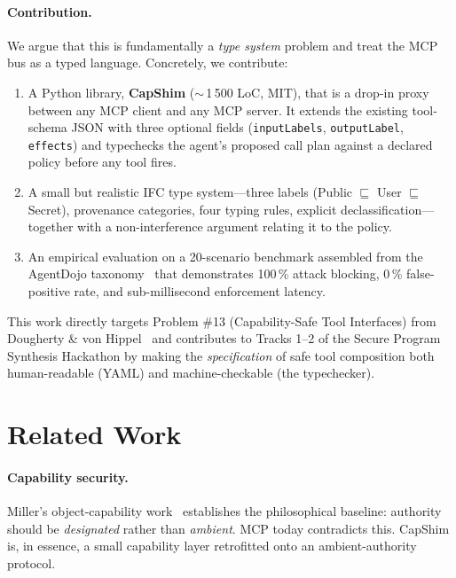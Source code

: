 \documentclass[11pt,a4paper]{article}
\begin{document}
\paragraph{Contribution.} We argue that this is fundamentally a
\emph{type system} problem and treat the MCP bus as a typed language.
Concretely, we contribute:
\begin{enumerate}[leftmargin=*]
\item A Python library, \textbf{CapShim} ($\sim$\,1\,500 LoC, MIT),
that is a drop-in proxy between any MCP client and any MCP server. It
extends the existing tool-schema JSON with three optional fields
(\texttt{inputLabels}, \texttt{outputLabel}, \texttt{effects}) and
typechecks the agent's proposed call plan against a declared policy
before any tool fires.
\item A small but realistic IFC type system---three labels (Public
$\sqsubseteq$ User $\sqsubseteq$ Secret), provenance categories, four
typing rules, explicit declassification---together with a
non-interference argument relating it to the policy.
\item An empirical evaluation on a 20-scenario benchmark assembled
from the AgentDojo taxonomy~\cite{debenedetti2024agentdojo} that
demonstrates 100\,\% attack blocking, 0\,\% false-positive rate, and
sub-millisecond enforcement latency.
\end{enumerate}
This work directly targets Problem \#13 (Capability-Safe Tool
Interfaces) from Dougherty \& von
Hippel~\cite{dougherty2026tractable} and contributes to Tracks 1--2
of the Secure Program Synthesis Hackathon by making the
\emph{specification} of safe tool composition both human-readable
(YAML) and machine-checkable (the typechecker).

\section{Related Work}

\paragraph{Capability security.} Miller's object-capability
work~\cite{miller2006robust} establishes the philosophical baseline:
authority should be \emph{designated} rather than \emph{ambient}.
MCP today contradicts this. CapShim is, in essence, a small
capability layer retrofitted onto an ambient-authority protocol.
\end{document}
